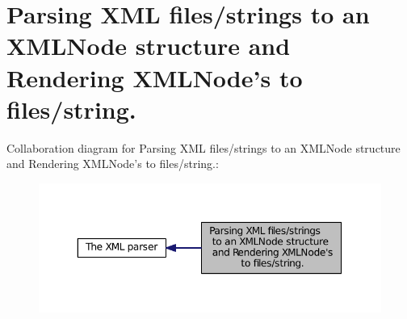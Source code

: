 \hypertarget{group__conversions}{\section{Parsing X\-M\-L files/strings to an X\-M\-L\-Node structure and Rendering X\-M\-L\-Node's to files/string.}
\label{group__conversions}
}
Collaboration diagram for Parsing X\-M\-L files/strings to an X\-M\-L\-Node structure and Rendering X\-M\-L\-Node's to files/string.\-:
\nopagebreak
\begin{figure}[H]
\begin{center}
\leavevmode
\includegraphics[width=350pt]{group__conversions}
\end{center}
\end{figure}

